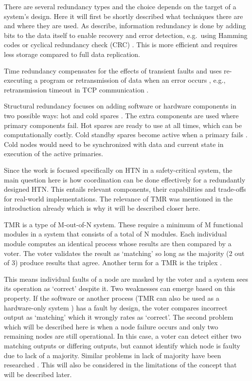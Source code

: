 There are several redundancy types and the choice depends on the target of a system's design. Here it will first be shortly described what techniques there are and where they are used. As \textcite{steen_distributed_2025} describe, information redundancy is done by adding bits to the data itself to enable recovery and error detection, e.g.\ using Hamming codes or cyclical redundancy check (CRC) \parencite{tsimbalo_fix_2015}. This is more efficient and requires less storage compared to full data replication.

Time redundancy compensates for the effects of transient faults and uses re-executing a program or retransmission of data when an error occurs \parencite{djambazova_redundancy_2023}, e.g., retransmission timeout in TCP communication \parencite{tanenbaum_computer_2003}.

Structural redundancy focuses on adding software or hardware components in two possible ways: hot and cold spares \parencite{djambazova_redundancy_2023}. The extra components are used where primary components fail. Hot spares are ready to use at all times, which can be computationally costly. Cold standby spares become active when a primary fails \parencite{djambazova_redundancy_2023}. Cold nodes would need to be synchronized with data and current state in execution of the active primaries.

Since the work is focused specifically on HTN in a safety-critical system, the main question here is how coordination can be done effectively for a redundantly designed HTN. This entails relevant components, their capabilities and trade-offs for real-world implementations. The relevance of TMR was mentioned in the introduction already which is why it will be described closer here.

TMR is a type of M-out-of-N system. These require a minimum of M functional modules in a system that consists of a total of N modules. Each individual module computes an identical process whose results are then compared by a voter. The voter validates the result as `matching' so long as the majority (2 out of 3) produce results that agree. Another term for a TMR is the triplex \parencite{koren_fault-tolerant_2021}.

This means individual faults of a node are masked by the voter and a system sees its operation as `correct' despite it. Two weaknesses can emerge based on this property. If the software or another process (TMR can also be used as a hardware-only system \parencite{mukherjee_triple_2019}) has a fault by design, the voter compares incorrect output as `matching' which it wrongly rates as `correct'. The second problem which will be described here is when a node failure occurs and only two remaining nodes are still operational. In this case, a voter can detect either two matching outputs or differing outputs, but cannot identify which node is faulty due to lack of a majority. Similar problems in lack of majority have been researched \parencite{shin_time_1994}. This will also be considered in the limitations of the concept that will be described later.

